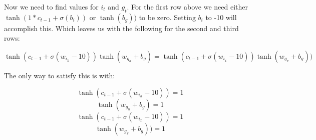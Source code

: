 \documentclass{article}
\begin{document}
Now we need to find values for $i_t$ and $g_t$. For the first row above we need either $\tanh(1*c_{t-1} + \sigma(b_i))$ or $\tanh(b_g))$ to be zero. Setting $b_i$ to -10 will accomplish this. Which leaves us with the following for the second and third rows: 
 

\begin{equation}
\tanh(c_{t-1} + \sigma(w_{i_h}-10))\tanh(w_{g_h}+b_g)=\tanh(c_{t-1} + \sigma(w_{i_x}-10))\tanh(w_{g_x}+b_g))
\end{equation}

The only way to satisfy this is with:

\begin{equation}\tanh(c_{t-1} + \sigma(w_{i_h}-10))=1\end{equation}
\begin{equation}\tanh(w_{g_h}+b_g)=1\end{equation}
\begin{equation}\tanh(c_{t-1} + \sigma(w_{i_x}-10))=1\end{equation}
\begin{equation}\tanh(w_{g_x}+b_g))=1\end{equation}
\end{document}
